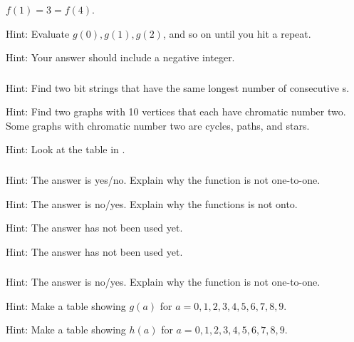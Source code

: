 \subsubsection*{ \answers}
\begin{apart}
    \item $f(1) = 3 = f(4)$.
    \item Hint: Evaluate $g(0), g(1), g(2)$, and so on until you hit a repeat.
    \item Hint: Your answer should include a negative integer.
\end{apart}

\subsubsection*{ \answers}
\begin{apart}
    \item Hint: Find two bit strings that have the same longest number of consecutive s.
    \item Hint: Find two graphs with 10 vertices that each have chromatic number two.  Some graphs with chromatic number two are cycles, paths, and stars.
    \item Hint: Look at the table in .
\end{apart}

\subsubsection*{ \answers}
\begin{apart}
    \item Hint: The answer is yes/no.  Explain why the function is not one-to-one.
    \item Hint: The answer is no/yes.  Explain why the functions is not onto.
    \item Hint: The answer has not been used yet.
    \item Hint: The answer has not been used yet.
\end{apart}

\subsubsection*{ \answers}
\begin{apart}
    \item Hint: The answer is no/yes.  Explain why the function is not one-to-one.
    \item Hint: Make a table showing $g(a)$ for $a = 0, 1, 2, 3, 4, 5, 6, 7, 8, 9$.
    \item Hint: Make a table showing $h(a)$ for $a = 0, 1, 2, 3, 4, 5, 6, 7, 8, 9$.
\end{apart}

